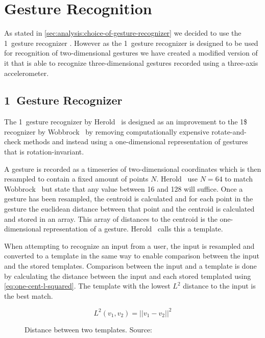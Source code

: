\section{Gesture Recognition}
\label{sec:design:gesture-recognition}

As stated in \cref{sec:analysis:choice-of-gesture-recognizer} we decided to use the 1\textcent~gesture recognizer \cite{herold20121}.
However as the 1\textcent~gesture recognizer is designed to be used for recognition of two-dimensional gestures we have created a modified version of it that is able to recognize three-dimensional gestures recorded using a three-axis accelerometer.

\subsection{1\textcent~Gesture Recognizer}
The 1\textcent~gesture recognizer by Herold \etal~is designed as an improvement to the 1\$ recognizer \cite{wobbrock2007gestures} by Wobbrock \etal~by removing computationally expensive rotate-and-check methods and instead using a one-dimensional representation of gestures that is rotation-invariant.

A gesture is recorded as a timeseries of two-dimensional coordinates which is then resampled to contain a fixed amount of points $N$.
Herold \etal~use $N = 64$ to match Wobbrock \etal~but state that any value between 16 and 128 will suffice.
Once a gesture has been resampled, the centroid is calculated and for each point in the gesture the euclidean distance between that point and the centroid is calculated and stored in an array.
This array of distances to the centroid is the one-dimensional representation of a gesture. Herold \etal~calls this a template.

When attempting to recognize an input from a user, the input is resampled and converted to a template in the same way to enable comparison between the input and the stored templates.
Comparison between the input and a template is done by calculating the distance between the input and each stored templated using \cref{eq:one-cent-l-squared}.
The template with the lowest $L^2$ distance to the input is the best match.

\begin{figure}
\begin{equation}
L^{2}(v_1, v_2) = \lvert\lvert v_1 - v_2 \rvert\rvert^2
\label{eq:one-cent-l-squared}
\end{equation}
\caption{Distance between two templates. Source: \cite{herold20121}}
\end{figure}

